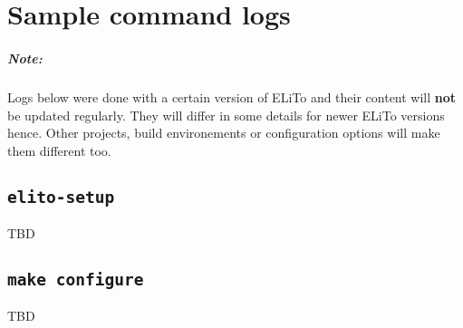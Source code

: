 \chapter{Sample command logs}

\paragraph{Note:}
Logs below were done with a certain version of ELiTo and their content
will \textbf{not} be updated regularly.  They will differ in some
details for newer ELiTo versions hence.  Other projects, build
environements or configuration options will make them different too.

\section[elito-setup]{\texttt{elito-setup}}
\label{app:log:quickstart_elito-setup}

TBD


\section[make configure]{\texttt{make configure}}
\label{app:log:quickstart_elito-configure}

TBD


